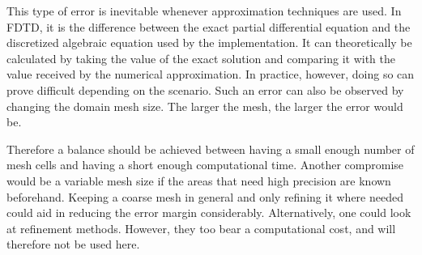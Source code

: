 This type of error is inevitable whenever approximation techniques are used. In FDTD, it is the difference between the exact partial differential equation and the discretized algebraic equation used by the implementation. It can theoretically be calculated by taking the value of the exact solution and comparing it with the value received by the numerical approximation. In practice, however, doing so can prove difficult depending on the scenario. Such an error can also be observed by changing the domain mesh size. The larger the mesh, the larger the error would be. 

Therefore a balance should be achieved between having a small enough number of mesh cells and having a short enough computational time. Another compromise would be a variable mesh size if the areas that need high precision are known beforehand. Keeping a coarse mesh in general and only refining it where needed could aid in reducing the error margin considerably.  Alternatively, one could look at refinement methods. However, they too bear a computational cost, and will therefore not be used here.
